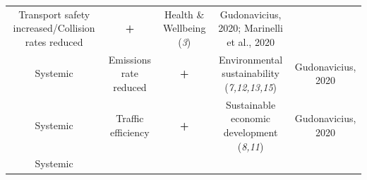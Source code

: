 \documentclass[
]{book}
\begin{document}
\begin{longtable}[]{@{}ccccc@{}}
\begin{minipage}[t]{0.16\columnwidth}
Transport safety increased/Collision rates reduced\strut
\end{minipage} & \begin{minipage}[t]{0.17\columnwidth}\centering
\textbf{+}\strut
\end{minipage} & \begin{minipage}[t]{0.17\columnwidth}\centering
Health \& Wellbeing (\emph{3})\strut
\end{minipage} & \begin{minipage}[t]{0.17\columnwidth}\centering
Gudonavicius, 2020; Marinelli et al., 2020\strut
\end{minipage}\tabularnewline
\begin{minipage}[t]{0.17\columnwidth}\centering
Systemic\strut
\end{minipage} & \begin{minipage}[t]{0.16\columnwidth}\centering
Emissions rate reduced\strut
\end{minipage} & \begin{minipage}[t]{0.17\columnwidth}\centering
\textbf{+}\strut
\end{minipage} & \begin{minipage}[t]{0.17\columnwidth}\centering
Environmental sustainability (\emph{7,12,13,15})\strut
\end{minipage} & \begin{minipage}[t]{0.17\columnwidth}\centering
Gudonavicius, 2020\strut
\end{minipage}\tabularnewline
\begin{minipage}[t]{0.17\columnwidth}\centering
Systemic\strut
\end{minipage} & \begin{minipage}[t]{0.16\columnwidth}\centering
Traffic efficiency\strut
\end{minipage} & \begin{minipage}[t]{0.17\columnwidth}\centering
\textbf{+}\strut
\end{minipage} & \begin{minipage}[t]{0.17\columnwidth}\centering
Sustainable economic development (\emph{8,11})\strut
\end{minipage} & \begin{minipage}[t]{0.17\columnwidth}\centering
Gudonavicius, 2020\strut
\end{minipage}\tabularnewline
\begin{minipage}[t]{0.17\columnwidth}\centering
Systemic\strut
\end{minipage} & \begin{minipage}[t]{0.16\columnwidth}\centering

\end{minipage}
\end{longtable}
\end{document}
